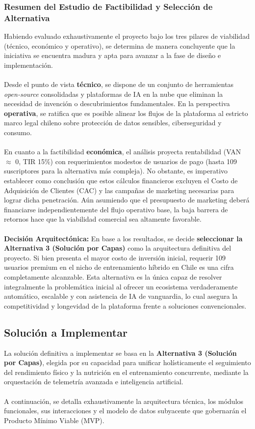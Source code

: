 \documentclass[12pt]{article}
\begin{document}
\subsubsection{Resumen del Estudio de Factibilidad y Selección de Alternativa}
Habiendo evaluado exhaustivamente el proyecto bajo los tres pilares de viabilidad (técnico, económico y operativo), se determina de manera concluyente que la iniciativa se encuentra madura y apta para avanzar a la fase de diseño e implementación.
\\\\
Desde el punto de vista \textbf{técnico}, se dispone de un conjunto de herramientas \textit{open-source} consolidadas y plataformas de IA en la nube que eliminan la necesidad de invención o descubrimientos fundamentales. En la perspectiva \textbf{operativa}, se ratifica que es posible alinear los flujos de la plataforma al estricto marco legal chileno sobre protección de datos sensibles, ciberseguridad y consumo.
\\\\
En cuanto a la factibilidad \textbf{económica}, el análisis proyecta rentabilidad (VAN $\approx$ 0, TIR 15\%) con requerimientos modestos de usuarios de pago (hasta 109 suscriptores para la alternativa más compleja). No obstante, es imperativo establecer como conclusión que estos cálculos financieros excluyen el Costo de Adquisición de Clientes (CAC) y las campañas de marketing necesarias para lograr dicha penetración. Aún asumiendo que el presupuesto de marketing deberá financiarse independientemente del flujo operativo base, la baja barrera de retornos hace que la viabilidad comercial sea altamente favorable.
\\\\
\textbf{Decisión Arquitectónica:} En base a los resultados, se decide \textbf{seleccionar la Alternativa 3 (Solución por Capas)} como la arquitectura definitiva del proyecto. Si bien presenta el mayor costo de inversión inicial, requerir 109 usuarios premium en el nicho de entrenamiento híbrido en Chile es una cifra completamente alcanzable. Esta alternativa es la única capaz de resolver integralmente la problemática inicial al ofrecer un ecosistema verdaderamente automático, escalable y con asistencia de IA de vanguardia, lo cual asegura la competitividad y longevidad de la plataforma frente a soluciones convencionales.
\newpage
\subsection{Solución a Implementar}
La solución definitiva a implementar se basa en la \textbf{Alternativa 3 (Solución por Capas)}, elegida por su capacidad para unificar holísticamente el seguimiento del rendimiento físico y la nutrición en el entrenamiento concurrente, mediante la orquestación de telemetría avanzada e inteligencia artificial.
\\\\
A continuación, se detalla exhaustivamente la arquitectura técnica, los módulos funcionales, sus interacciones y el modelo de datos subyacente que gobernarán el Producto Mínimo Viable (MVP).
\newpage
\end{document}
